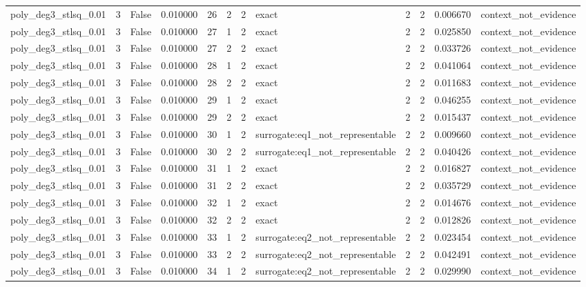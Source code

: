 \begin{tabular}{lrrrrrrlrrrl}
poly\_deg3\_stlsq\_0.01 & 3 & False & 0.010000 & 26 & 2 & 2 & exact & 2 & 2 & 0.006670 & context\_not\_evidence \\
poly\_deg3\_stlsq\_0.01 & 3 & False & 0.010000 & 27 & 1 & 2 & exact & 2 & 2 & 0.025850 & context\_not\_evidence \\
poly\_deg3\_stlsq\_0.01 & 3 & False & 0.010000 & 27 & 2 & 2 & exact & 2 & 2 & 0.033726 & context\_not\_evidence \\
poly\_deg3\_stlsq\_0.01 & 3 & False & 0.010000 & 28 & 1 & 2 & exact & 2 & 2 & 0.041064 & context\_not\_evidence \\
poly\_deg3\_stlsq\_0.01 & 3 & False & 0.010000 & 28 & 2 & 2 & exact & 2 & 2 & 0.011683 & context\_not\_evidence \\
poly\_deg3\_stlsq\_0.01 & 3 & False & 0.010000 & 29 & 1 & 2 & exact & 2 & 2 & 0.046255 & context\_not\_evidence \\
poly\_deg3\_stlsq\_0.01 & 3 & False & 0.010000 & 29 & 2 & 2 & exact & 2 & 2 & 0.015437 & context\_not\_evidence \\
poly\_deg3\_stlsq\_0.01 & 3 & False & 0.010000 & 30 & 1 & 2 & surrogate:eq1\_not\_representable & 2 & 2 & 0.009660 & context\_not\_evidence \\
poly\_deg3\_stlsq\_0.01 & 3 & False & 0.010000 & 30 & 2 & 2 & surrogate:eq1\_not\_representable & 2 & 2 & 0.040426 & context\_not\_evidence \\
poly\_deg3\_stlsq\_0.01 & 3 & False & 0.010000 & 31 & 1 & 2 & exact & 2 & 2 & 0.016827 & context\_not\_evidence \\
poly\_deg3\_stlsq\_0.01 & 3 & False & 0.010000 & 31 & 2 & 2 & exact & 2 & 2 & 0.035729 & context\_not\_evidence \\
poly\_deg3\_stlsq\_0.01 & 3 & False & 0.010000 & 32 & 1 & 2 & exact & 2 & 2 & 0.014676 & context\_not\_evidence \\
poly\_deg3\_stlsq\_0.01 & 3 & False & 0.010000 & 32 & 2 & 2 & exact & 2 & 2 & 0.012826 & context\_not\_evidence \\
poly\_deg3\_stlsq\_0.01 & 3 & False & 0.010000 & 33 & 1 & 2 & surrogate:eq2\_not\_representable & 2 & 2 & 0.023454 & context\_not\_evidence \\
poly\_deg3\_stlsq\_0.01 & 3 & False & 0.010000 & 33 & 2 & 2 & surrogate:eq2\_not\_representable & 2 & 2 & 0.042491 & context\_not\_evidence \\
poly\_deg3\_stlsq\_0.01 & 3 & False & 0.010000 & 34 & 1 & 2 & surrogate:eq2\_not\_representable & 2 & 2 & 0.029990 & context\_not\_evidence \\

\end{tabular}
